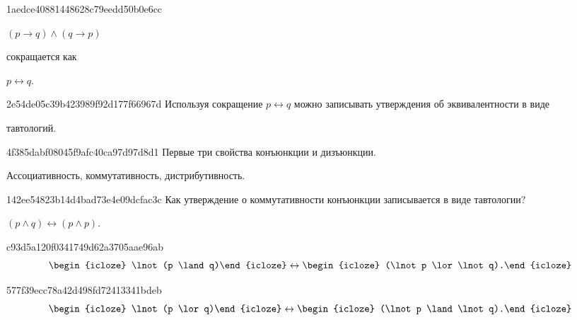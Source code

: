 \begin{note}{1aedce40881448628c79eedd50b0e6cc}
    \begin{icloze}{2}\({ (p \to q) \land (q \to p) }\)\end{icloze} сокращается как \begin{icloze}{1}\({ p \leftrightarrow q }\).\end{icloze}
\end{note}

\begin{note}{2e54de05c39b423989f92d177f66967d}
    Используя сокращение \({ p \leftrightarrow q }\) можно записывать утверждения об эквивалентности в виде \begin{icloze}{1}тавтологий.\end{icloze}
\end{note}

\begin{note}{4f385dabf08045f9afc40ca97d97d8d1}
    Первые три свойства конъюнкции и дизъюнкции.

    \begin{cloze}{1}
        Ассоциативность, коммутативность, дистрибутивность.
    \end{cloze}
\end{note}

\begin{note}{142ee54823b14d4bad73e4e09dcfac3c}
    Как утверждение о коммутативности конъюнкции записывается в виде тавтологии?

    \begin{cloze}{1}
        \({ (p \land q) \leftrightarrow (p \land p) }\).
    \end{cloze}
\end{note}

\begin{note}{c93d5a120f0341749d62a3705aae96ab}
    \[
        \begin{icloze}{2}\lnot (p \land q)\end{icloze} \leftrightarrow \begin{icloze}{1}(\lnot p \lor \lnot q).\end{icloze}
    \]
\end{note}

\begin{note}{577f39ecc78a42d498fd72413341bdeb}
    \[
        \begin{icloze}{2}\lnot (p \lor q)\end{icloze} \leftrightarrow \begin{icloze}{1}(\lnot p \land \lnot q).\end{icloze}
    \]
\end{note}

